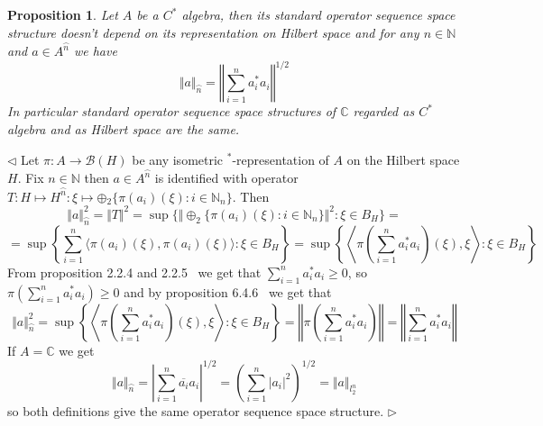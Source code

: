 \documentclass[12pt]{article}
\newtheorem{proposition}[theorem]{Proposition}
\newenvironment{proof}{\par $\triangleleft$}{$\triangleright$}
\begin{document}
\begin{proposition}\label{PrCstarAlgSQ} Let $A$ be a $C^*$ algebra, then its
standard operator sequence space structure doesn't depend on its representation
on Hilbert space and for any $n\in\mathbb{N}$ and $a\in A^{\wideparen{n}}$ we
have
$$
\Vert a\Vert_{\wideparen{n}}
=\left\Vert\sum\limits_{i=1}^n a_i^*a_i\right\Vert^{1/2}
$$
In particular standard operator sequence space structures of $\mathbb{C}$
regarded as $C^*$ algebra and as Hilbert space are the same.
\end{proposition}
\begin{proof} Let $\pi:A\to\mathcal{B}(H)$ be any isometric
${}^*$-representation of $A$ on the Hilbert space $H$. Fix $n\in\mathbb{N}$ then
$a\in A^{\wideparen{n}}$ is identified with operator $T:H\mapsto
H^{\wideparen{n}}:\xi\mapsto \oplus{}_2 \{\pi(a_i)(\xi):i\in\mathbb{N}_n \}$. 
Then
$$
\Vert a\Vert_{\wideparen{n}}^2
=\Vert T\Vert^2
=\sup \{\Vert \oplus_2 \{\pi(a_i)(\xi):i\in\mathbb{N}_n \}\Vert^2:\xi\in B_H \}=
$$
$$
=\sup\left \{ 
    \sum\limits_{i=1}^n\langle \pi(a_i)(\xi),\pi(a_i)(\xi)\rangle:\xi\in B_H
\right \}
=\sup\left \{ 
    \left\langle \pi\left(
        \sum\limits_{i=1}^n a_i^*a_i
    \right)(\xi),\xi\right\rangle:\xi\in B_H
\right \}
$$
From proposition 2.2.4 and 2.2.5~\cite{MurphCstarOpTh} we get that $\sum_{i=1}^n
a_i^* a_i\geq 0$, so $\pi(\sum_{i=1}^n a_i^* a_i)\geq 0$ and by proposition
6.4.6~\cite{HelFA} we get that
$$
\Vert a\Vert_{\wideparen{n}}^2
=\sup\left \{ 
    \left\langle \pi\left(
        \sum\limits_{i=1}^n a_i^*a_i
    \right)(\xi),\xi\right\rangle:\xi\in B_H
\right \}
=\left\Vert \pi\left(\sum\limits_{i=1}^n a_i^*a_i\right)\right\Vert
=\left\Vert \sum\limits_{i=1}^n a_i^*a_i\right\Vert
$$
If $A=\mathbb{C}$ we get
$$
\Vert a\Vert_{\wideparen{n}}
=\left| \sum\limits_{i=1}^n \overline{a_i}a_i\right|^{1/2}
={\left(\sum\limits_{i=1}^n |a_i|^2\right)}^{1/2}
=\Vert a\Vert_{l_2^n}
$$
so both definitions give the same operator sequence space structure.
\end{proof}
\end{document}
